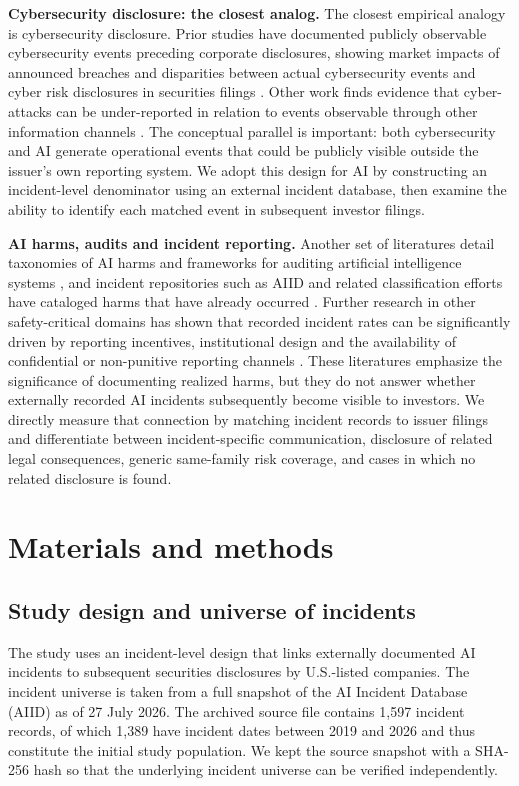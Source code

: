 \documentclass[utf8]{FrontiersinHarvard}
\begin{document}
\textbf{Cybersecurity disclosure: the closest analog.} The closest empirical analogy is cybersecurity disclosure. Prior studies have documented publicly observable cybersecurity events preceding corporate disclosures, showing market impacts of announced breaches and disparities between actual cybersecurity events and cyber risk disclosures in securities filings \citep{Campbell2003,KannanReesSridhar2007,Gordon2006,Gordon2010,WangKannanUlmer2013}. Other work finds evidence that cyber-attacks can be under-reported in relation to events observable through other information channels \citep{Amir2018}. The conceptual parallel is important: both cybersecurity and AI generate operational events that could be publicly visible outside the issuer's own reporting system. We adopt this design for AI by constructing an incident-level denominator using an external incident database, then examine the ability to identify each matched event in subsequent investor filings.

\textbf{AI harms, audits and incident reporting.} Another set of literatures detail taxonomies of AI harms and frameworks for auditing artificial intelligence systems \citep{Weidinger2022,Raji2020,Bommasani2021,CostanzaChock2022}, and incident repositories such as AIID and related classification efforts have cataloged harms that have already occurred \citep{McGregor2021,OECD2024}. Further research in other safety-critical domains has shown that recorded incident rates can be significantly driven by reporting incentives, institutional design and the availability of confidential or non-punitive reporting channels \citep{Barach2000,Classen2011,Macrae2016}. These literatures emphasize the significance of documenting realized harms, but they do not answer whether externally recorded AI incidents subsequently become visible to investors. We directly measure that connection by matching incident records to issuer filings and differentiate between incident-specific communication, disclosure of related legal consequences, generic same-family risk coverage, and cases in which no related disclosure is found.

\section{Materials and methods}

\subsection{Study design and universe of incidents}
The study uses an incident-level design that links externally documented AI incidents to subsequent securities disclosures by U.S.-listed companies. The incident universe is taken from a full snapshot of the AI Incident Database (AIID) as of 27 July 2026. The archived source file contains 1{,}597 incident records, of which 1{,}389 have incident dates between 2019 and 2026 and thus constitute the initial study population. We kept the source snapshot with a SHA-256 hash so that the underlying incident universe can be verified independently.
\end{document}

